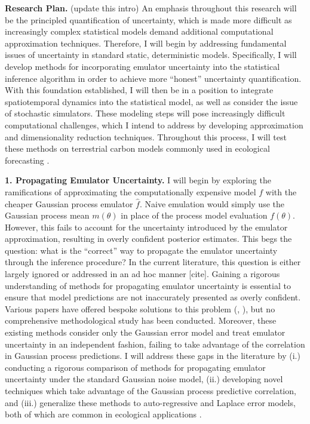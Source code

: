 \documentclass[12pt]{article}
\begin{document}
\noindent
\textbf{Research Plan.} (update this intro) An emphasis throughout this research will be the principled quantification of uncertainty, which is made more difficult
as increasingly complex statistical models demand additional computational approximation techniques. Therefore, I will begin by addressing fundamental issues of uncertainty in standard static, deterministic models. Specifically, I will develop methods for incorporating emulator uncertainty into the statistical inference algorithm in order to achieve more ``honest'' uncertainty quantification. With this foundation established, I will then be in a position to integrate spatiotemporal dynamics into the statistical model, as well as consider the issue of stochastic simulators. These modeling steps will pose increasingly difficult computational challenges, which I intend to address by developing approximation and dimensionality reduction techniques. Throughout this process, I will test these methods on terrestrial carbon models commonly used in ecological forecasting \cite{Dietze}. 
 
 \textbf{1. Propagating Emulator Uncertainty.} I will begin by exploring the ramifications of approximating the computationally expensive model $f$ with the  cheaper Gaussian process emulator $\hat{f}$. Naive emulation would simply use the Gaussian process mean $m(\theta)$ in place of the process model evaluation $f(\theta)$. However, this fails to account
 for the uncertainty introduced by the emulator approximation, resulting in overly confident posterior estimates. This begs the question: what is the ``correct'' way to propagate the emulator uncertainty through the inference procedure? In the current literature, this question is either largely ignored or addressed in an ad hoc manner [cite]. Gaining a rigorous understanding of methods for propagating emulator uncertainty is essential to ensure that model predictions are not inaccurately presented as overly confident. Various papers have offered bespoke solutions to this problem (\cite{Cleary}, \cite{Fer}), but no comprehensive
methodological study has been conducted. Moreover, these existing methods consider only the Gaussian error model and treat emulator uncertainty in an independent fashion, failing to take advantage of the correlation in Gaussian process predictions. I will address these gaps in the literature by (i.) conducting a rigorous comparison of methods for propagating emulator uncertainty under the standard Gaussian noise model, (ii.) developing novel techniques which take advantage of the Gaussian process predictive correlation, and (iii.) generalize these methods to auto-regressive and Laplace error models, both of which 
are common in ecological applications \cite{Fer}. 
 
\end{document}
